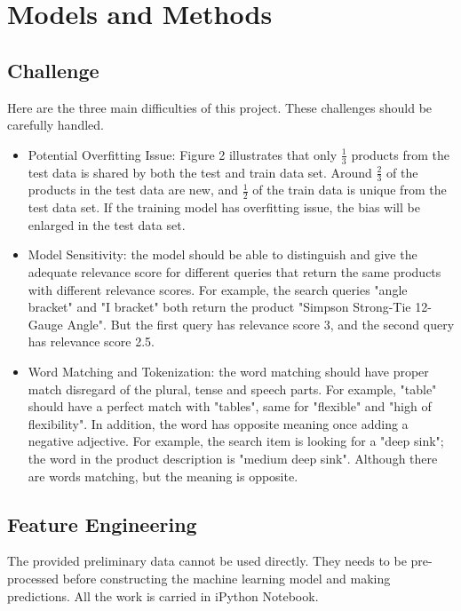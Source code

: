 \documentclass[11pt, titlepage]{article}
\begin{document}
\section{Models and Methods}

\subsection{Challenge}

Here are the three main difficulties of this project. These challenges should be carefully handled.

\begin{itemize}
\item Potential Overfitting Issue: Figure 2 illustrates that only $\frac{1}{3}$ products from the test data is shared by both the test and train data set. Around $\frac{2}{3}$ of the products in the test data are new, and $\frac{1}{2}$ of the train data is unique from the test data set. If the training model has overfitting issue, the bias will be enlarged in the test data set.
\item Model Sensitivity: the model should be able to distinguish and give the adequate relevance score for different queries that return the same products with different relevance scores. For example, the search queries "angle bracket" and "I bracket" both return the product "Simpson Strong-Tie 12-Gauge Angle". But the first query has relevance score 3, and the second query has relevance score 2.5. 
\item Word Matching and Tokenization: the word matching should have proper match disregard of the plural, tense and speech parts. For example, "table" should have a perfect match with "tables", same for "flexible" and "high of flexibility". In addition, the word has opposite meaning once adding a negative adjective. For example, the search item is looking for a "deep sink"; the word in the product description is "medium deep sink". Although there are words matching, but the meaning is opposite. 
\end{itemize}


\subsection{Feature Engineering}

The provided preliminary data cannot be used directly. They needs to be pre-processed before constructing the machine learning model and making predictions. All the work is carried in iPython Notebook.
\end{document}
